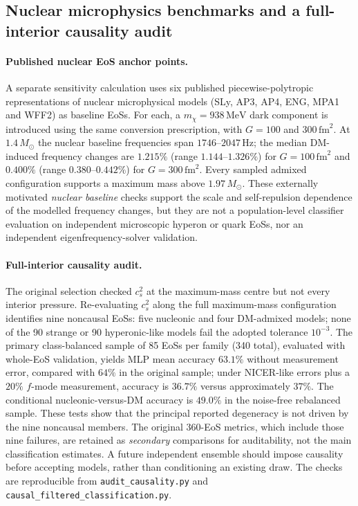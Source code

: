 \documentclass[11pt,a4paper]{article}
\newcommand{\Msun}{M_\odot}
\begin{document}
\subsection{Nuclear microphysics benchmarks and a full-interior causality audit}\label{sec:causalcheck}
\paragraph{Published nuclear EoS anchor points.} A separate sensitivity calculation uses six published piecewise-polytropic representations of nuclear microphysical models (SLy, AP3, AP4, ENG, MPA1 and WFF2) as baseline EoSs. For each, a $m_\chi=938\,\mathrm{MeV}$ dark component is introduced using the same conversion prescription, with $G=100$ and $300\,\mathrm{fm}^2$. At $1.4\,\Msun$ the nuclear baseline frequencies span $1746$--$2047\,\mathrm{Hz}$; the median DM-induced frequency changes are $1.215\%$ (range $1.144$--$1.326\%$) for $G=100\,\mathrm{fm}^2$ and $0.400\%$ (range $0.380$--$0.442\%$) for $G=300\,\mathrm{fm}^2$. Every sampled admixed configuration supports a maximum mass above $1.97\,\Msun$. These externally motivated \emph{nuclear baseline} checks support the scale and self-repulsion dependence of the modelled frequency changes, but they are not a population-level classifier evaluation on independent microscopic hyperon or quark EoSs, nor an independent eigenfrequency-solver validation.
\paragraph{Full-interior causality audit.} The original selection checked $c_s^2$ at the maximum-mass centre but not every interior pressure. Re-evaluating $c_s^2$ along the full maximum-mass configuration identifies nine noncausal EoSs: five nucleonic and four DM-admixed models; none of the 90 strange or 90 hyperonic-like models fail the adopted tolerance $10^{-3}$. The primary class-balanced sample of 85 EoSs per family (340 total), evaluated with whole-EoS validation, yields MLP mean accuracy $63.1\%$ without measurement error, compared with $64\%$ in the original sample; under NICER-like errors plus a $20\%$ $f$-mode measurement, accuracy is $36.7\%$ versus approximately $37\%$. The conditional nucleonic-versus-DM accuracy is $49.0\%$ in the noise-free rebalanced sample. These tests show that the principal reported degeneracy is not driven by the nine noncausal members. The original 360-EoS metrics, which include those nine failures, are retained as \emph{secondary} comparisons for auditability, not the main classification estimates. A future independent ensemble should impose causality before accepting models, rather than conditioning an existing draw. The checks are reproducible from \texttt{audit\_causality.py} and \texttt{causal\_filtered\_classification.py}.
\end{document}
